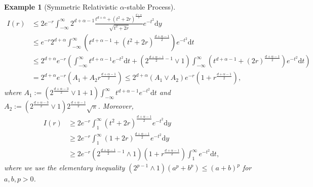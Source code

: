 \documentclass[12pt,a4paper]{article}
\newtheorem{example}[thm]{Example}
\renewcommand{\d}{\mathrm{d}}
\newcommand{\1}{{\bf 1}}
\begin{document}
\begin{example}[Symmetric Relativistic $\alpha$-stable Process]
\begin{align*}
I(r)&\leq 2e^{-r}\int_{-\infty}^{\infty}
2^{d+\alpha-1}\frac{t^{d+\alpha}+(t^2+2r)^{\frac{d+\alpha}{2}}}{\sqrt{t^2+2r}}
e^{-t^2}{\d} y\\
&\leq e^{-r}2^{d+\alpha}\int_{-\infty}^{\infty}\left(t^{d+\alpha-1}+(t^2+2r)^{\frac{d+\alpha-1}{2}} \right)e^{-t^2}{\d} t\\
&\leq2^{d+\alpha}e^{-r}\left(\int_{-\infty}^{\infty}t^{d+\alpha-1}e^{-t^2}{\d} t + (2^{\frac{d+\alpha-1}{2}-1}\lor 1)\int_{-\infty}^{\infty}
(t^{d+\alpha-1}+(2r)^{\frac{d+\alpha-1}{2}})e^{-t^2}{\d} t
\right)\\
&=2^{d+\alpha}e^{-r}(A_1+A_2r^{\frac{d+\alpha-1}{2}})\leq 2^{d+\alpha}(A_1\lor A_2)e^{-r}(1+r^{\frac{d+\alpha-1}{2}}),
\end{align*}
where $A_1:=(2^{\frac{d+\alpha-3}{2}}\lor 1+1)\int_{-\infty}^{\infty}t^{d+\alpha-1}e^{-t^2}{\d} t$ and $A_2:=(2^{\frac{d+\alpha-3}{2}}\lor 1)2^{\frac{d+\alpha-1}{2}}\sqrt{\pi}$. 
Moreover, 
\begin{align*}
I(r)&\geq 2e^{-r}\int_1^{\infty}(t^2+2r)^{\frac{d+\alpha-1}{2}}e^{-t^2}{\d} y\\
&\geq 2e^{-r}\int_1^{\infty}(1+2r)^{\frac{d+\alpha-1}{2}}e^{-t^2}{\d} y\\
&\geq 2e^{-r}(2^{\frac{d+\alpha-1}{2}-1}\land1)(1+r^{\frac{d+\alpha-1}{2}})\int_1^{\infty}e^{-t^2}{\d} t,
\end{align*}
where we use the elementary inequality $(2^{p-1}\land1)(a^p+b^p)\leq(a+b)^p$ for $a,b,p>0$. 


\end{example}
\end{document}
